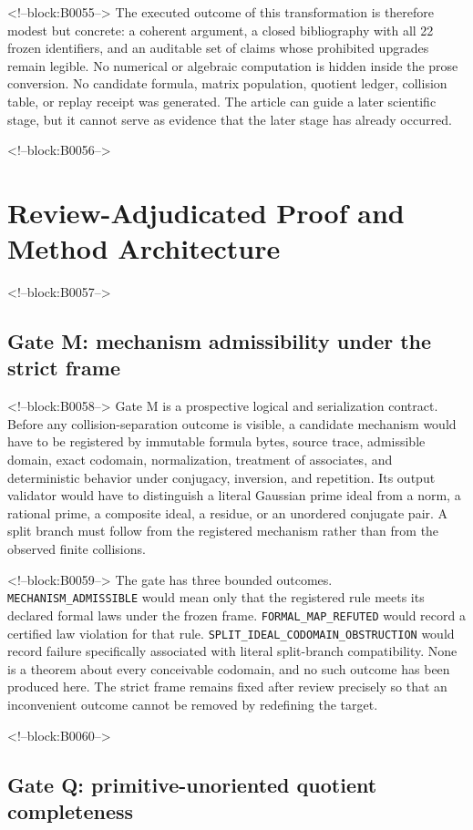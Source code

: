 \documentclass[11pt,a4paper]{article}
\begin{document}
<!--block:B0055-->
The executed outcome of this transformation is therefore modest but concrete: a coherent argument, a closed bibliography with all 22 frozen identifiers, and an auditable set of claims whose prohibited upgrades remain legible. No numerical or algebraic computation is hidden inside the prose conversion. No candidate formula, matrix population, quotient ledger, collision table, or replay receipt was generated. The article can guide a later scientific stage, but it cannot serve as evidence that the later stage has already occurred.

<!--block:B0056-->
\section{Review-Adjudicated Proof and Method Architecture}

<!--block:B0057-->
\subsection{Gate M: mechanism admissibility under the strict frame}

<!--block:B0058-->
Gate M is a prospective logical and serialization contract. Before any collision-separation outcome is visible, a candidate mechanism would have to be registered by immutable formula bytes, source trace, admissible domain, exact codomain, normalization, treatment of associates, and deterministic behavior under conjugacy, inversion, and repetition. Its output validator would have to distinguish a literal Gaussian prime ideal from a norm, a rational prime, a composite ideal, a residue, or an unordered conjugate pair. A split branch must follow from the registered mechanism rather than from the observed finite collisions.

<!--block:B0059-->
The gate has three bounded outcomes. \texttt{MECHANISM\_ADMISSIBLE} would mean only that the registered rule meets its declared formal laws under the frozen frame. \texttt{FORMAL\_MAP\_REFUTED} would record a certified law violation for that rule. \texttt{SPLIT\_IDEAL\_CODOMAIN\_OBSTRUCTION} would record failure specifically associated with literal split-branch compatibility. None is a theorem about every conceivable codomain, and no such outcome has been produced here. The strict frame remains fixed after review precisely so that an inconvenient outcome cannot be removed by redefining the target.

<!--block:B0060-->
\subsection{Gate Q: primitive-unoriented quotient completeness}
\end{document}
